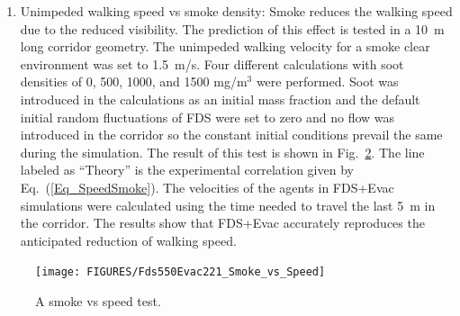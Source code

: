 \documentclass[12pt,a4paper,final,twoside]{stylevk}
\begin{document}
\begin{enumerate}
  geometry with no fire source and one agent in the middle of the room
  is used.  The agent is fixed at its initial position by setting the
  detection time large and by setting random noise of the movement
  equations to zero.  FDS point measurements of the gas concentrations
  and FED are placed at the position of the agent.  The room is
  initialized with different CO, CO${}_2$, and 0${}_2$ concentrations
  to test the overall FED calculation and each different component
  separately also.  The concentrations for the four different
  calculations were: (2, 0.1, 15)~\%, (0, 0, 12)~\% (0, 0.1, 21)~\%,
  and (3.43, 0.1, 21)~\% for the (CO${}_2$, CO, O${}_2$) volume
  fractions.  The room stays at the specified initial conditions,
  because there is nothing to generate a flow and also the initial
  random noise of FDS flow calculation is switched off.  The FDS+Evac
  output for the FED index of the agent is compared to a value
  computed using an external worksheet and the FDS point measurements
  for gas concentrations and for the FED index.  The results of the
  comparison are shown in Fig.~\ref{Fig_FED_Test}.  The results
  indicate that the FED calculation in FDS+Evac is implemented
  correctly (and that the ``FED'' point measurement output is also
  implemented correctly).
%
\begin{figure}[!tb]
  \centerline{\texttt{[image: FIGURES/Test\_Fds550Evac221\_FED]}} 
  \caption{A FED test.}\label{Fig_FED_Test}
\end{figure}
%
\item Unimpeded walking speed vs smoke density: Smoke reduces the
  walking speed due to the reduced visibility.  The prediction of this
  effect is tested in a 10~m long corridor geometry.  The unimpeded
  walking velocity for a smoke clear environment was set to 1.5~m/s.
  Four different calculations with soot densities of 0, 500, 1000, and
  1500 mg/m${}^\textrm{3}$ were performed.  Soot was introduced in the
  calculations as an initial mass fraction and the default initial
  random fluctuations of FDS were set to zero and no flow was
  introduced in the corridor so the constant initial conditions
  prevail the same during the simulation.  The result of this test is
  shown in Fig.~\ref{Fig_SmokeSpeedTest}.  The line labeled as
  ``Theory'' is the experimental correlation given by
  Eq.~(\ref{Eq_SpeedSmoke}).  The velocities of the agents in FDS+Evac
  simulations were calculated using the time needed to travel the last
  5~m in the corridor.  The results show that FDS+Evac accurately
  reproduces the anticipated reduction of walking speed.
%
\end{enumerate}
%
%
\begin{figure}[!tb]
  \centerline{\texttt{[image: FIGURES/Fds550Evac221\_Smoke\_vs\_Speed]}}   
  \caption{A smoke vs speed test.}\label{Fig_SmokeSpeedTest}
\end{figure}
%
\end{document}
